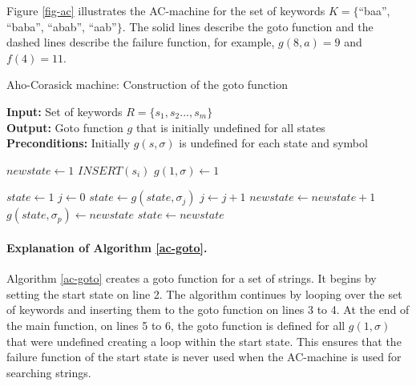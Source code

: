 \documentclass[english,twoside,censored,csm,algorithms-track-2020]{HYthesisML}
\theoremstyle{plain}
\theoremstyle{definition}
\numberwithin{testexample}{chapter}
\begin{document}
Figure \ref{fig-ac} illustrates the AC-machine for the set of
keywords $K=\{$``baa'', ``baba'', ``abab'', ``aab''$\}$. The solid lines describe the goto function
and the dashed lines describe the failure function, for example, $g(8, a) = 9$ and $f(4)=11$.

\begin{algorithm}[t]
  
  \caption{Aho-Corasick machine: Construction of the goto function} \label{ac-goto}
  \hspace*{\algorithmicindent} \textbf{Input:} Set of keywords $R = \{s_1,s_2...,s_m\}$\\
  \hspace*{\algorithmicindent} \textbf{Output:} Goto function $g$ that is initially undefined for all states\\
  \hspace*{\algorithmicindent} \textbf{Preconditions:} Initially $g(s,\sigma)$ is undefined for each state and symbol
  
      \begin{algorithmic}[1]

          \State $newstate\gets 1$
            \State $INSERT(s_i)$
          \EndFor
            \State $g(1,\sigma)\gets 1$
          \EndFor
        \EndFunction

      \item[]

          \State $state\gets 1$
          \State $j\gets 0$
            \State $state\gets g(state,\sigma_j)$
            \State $j\gets j+1$
          \EndWhile
            \State $newstate\gets newstate+1$
            \State $g(state,\sigma_p)\gets newstate$
            \State $state\gets newstate$
          \EndFor
        \EndFunction
      \end{algorithmic}
      
  \end{algorithm}

  \paragraph{Explanation of Algorithm \ref{ac-goto}.}
  Algorithm \ref{ac-goto} creates a goto function for a set of strings. It begins by setting the start state on line 2.
  The algorithm continues by looping over the set of keywords and inserting them to the
  goto function on lines 3 to 4. At the end of the main function, on lines 5 to 6,
  the goto function is defined for all $g(1,\sigma)$ that were undefined creating a loop within
  the start state. This ensures that the failure function of the start state is never used when the
  AC-machine is used for searching strings.
\end{document}
